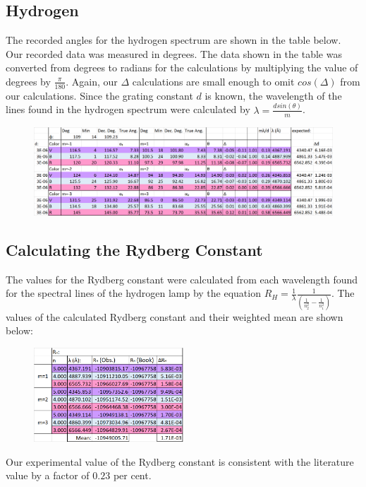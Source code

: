 \documentclass[a4paper]{article}
\begin{document}
\subsection{Hydrogen}
The recorded angles for the hydrogen spectrum are shown in the table below. Our recorded data was measured in degrees. The data shown in the table was converted from degrees to radians for the calculations by multiplying the value of degrees by $\frac{\pi}{180}$. Again, our $\Delta$ calculations are small enough to omit $cos(\Delta)$ from our calculations. Since the grating constant $d$ is known, the wavelength of the lines found in the hydrogen spectrum were calculated by $\lambda = \frac{dsin(\theta)}{m}$.
\begin{figure}[h]
\centering
\includegraphics[width=1.15\textwidth]{hy1}
\end{figure}
\subsection{Calculating the Rydberg Constant}
The values for the Rydberg constant were calculated from each wavelength found for the spectral lines of the hydrogen lamp by the equation $R_H = \frac{1}{\lambda} \frac{1}{(\frac{1}{n_2 ^2}-\frac{1}{n_1 ^2})}$. The values of the calculated Rydberg constant and their weighted mean are shown below:
\begin{figure}[h]
\centering
\includegraphics[width=0.5\textwidth]{hy2}
\end{figure}

Our experimental value of the Rydberg constant is consistent with the literature value by a factor of $0.23$ per cent.
\clearpage
\end{document}
